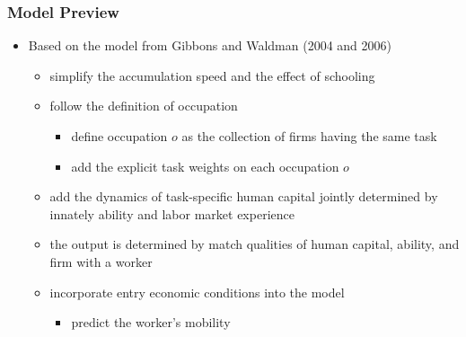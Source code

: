 \documentclass[10pt,svgnames,fragile]{beamer}
\begin{document}
\begin{frame}
	\frametitle{Model Preview}
	\begin{itemize}
		\item Based on the model from  Gibbons and Waldman {\small (2004 and 2006)}
\vfill
		\begin{itemize}
			\item simplify the accumulation speed and the effect of schooling
\vfill
			\item follow the definition of occupation
			\begin{itemize}
				\vfill
				\item  define occupation $o$ as the collection of firms having the same task
				\vfill
				\item add the explicit task weights on each occupation $o$
			\end{itemize}
\vfill
\item add the dynamics of task-specific human capital jointly determined by innately ability and labor market experience 
\vfill
		\item the output is determined by match qualities of human capital, ability, and firm with a worker
		\vfill
	\item incorporate entry economic conditions into the model
		\begin{itemize}
			\vfill
			\item predict the worker's mobility
		\end{itemize}
		\vfill
		\end{itemize}
\end{itemize}
\end{frame}
\end{document}
